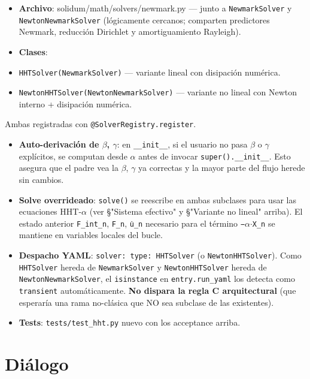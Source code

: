 \documentclass[11pt,letterpaper,oneside]{report}
\begin{document}
\begin{itemize}
  \item \textbf{Archivo}: solidum/math/solvers/newmark.py --- junto a \texttt{NewmarkSolver} y \texttt{NewtonNewmarkSolver} (lógicamente cercanos; comparten predictores Newmark, reducción Dirichlet y amortiguamiento Rayleigh).
  \item \textbf{Clases}:
  \item \texttt{HHTSolver(NewmarkSolver)} --- variante lineal con disipación numérica.
  \item \texttt{NewtonHHTSolver(NewtonNewmarkSolver)} --- variante no lineal con Newton interno + disipación numérica.
\end{itemize}
  Ambas registradas con \texttt{@SolverRegistry.register}.
\begin{itemize}
  \item \textbf{Auto-derivación de \ensuremath{\beta}, \ensuremath{\gamma}}: en \texttt{\_\_init\_\_}, si el usuario no pasa \ensuremath{\beta} o \ensuremath{\gamma} explícitos, se computan desde \ensuremath{\alpha} antes de invocar \texttt{super().\_\_init\_\_}. Esto asegura que el padre vea la \ensuremath{\beta}, \ensuremath{\gamma} ya correctas y la mayor parte del flujo herede sin cambios.
  \item \textbf{Solve overrideado}: \texttt{solve()} se reescribe en ambas subclases para usar las ecuaciones HHT-\ensuremath{\alpha} (ver §"Sistema efectivo" y §"Variante no lineal" arriba). El estado anterior \texttt{F\_int\_n}, \texttt{F\_n}, \texttt{u̇\_n} necesario para el término \texttt{−\ensuremath{\alpha}\ensuremath{\cdot}X\_n} se mantiene en variables locales del bucle.
  \item \textbf{Despacho YAML}: \texttt{solver: type: HHTSolver} (o \texttt{NewtonHHTSolver}). Como \texttt{HHTSolver} hereda de \texttt{NewmarkSolver} y \texttt{NewtonHHTSolver} hereda de \texttt{NewtonNewmarkSolver}, el \texttt{isinstance} en \texttt{entry.run\_yaml} los detecta como \texttt{transient} automáticamente. \textbf{No dispara la regla C arquitectural} (que esperaría una rama no-clásica que NO sea subclase de las existentes).
  \item \textbf{Tests}: \texttt{tests/test\_hht.py} nuevo con los acceptance arriba.
\end{itemize}


\section{Diálogo}
\end{document}

